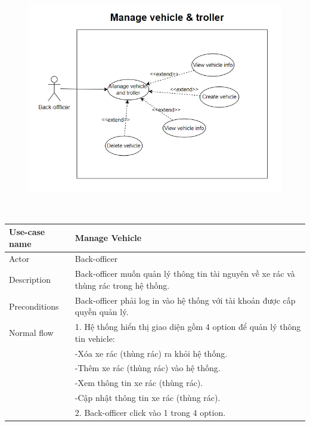 \documentclass[a4paper]{article}
\begin{document}
\begin{enumerate}
\begin{enumerate}
    \\
    \begin{figure}[!h]
        \centering
        \includegraphics[width=6in]{Image/manageVehicle_diagram.png}
    \end{figure}
    \\
    \begin{tabular}{| p{3cm} | p{10cm} |}
    \hline
         Use-case name & \textbf{Manage Vehicle}  \\
         \hline
         Actor & Back-officer \\
         \hline 
         Description & Back-officer muốn quản lý thông tin tài nguyên về xe rác và thùng rác trong hệ thống. \\
         \hline 
         Preconditions & Back-officer phải log in vào hệ thống với tài khoản được cấp quyền quản lý. \\
         \hline
         Normal flow 
         &1. Hệ thống hiển thị giao diện gồm 4 option để quản lý thông tin vehicle: \\
            &\hspace{1cm} -Xóa xe rác (thùng rác) ra khỏi hệ thống. \\
            &\hspace{1cm} -Thêm xe rác (thùng rác)  vào hệ thống. \\
            &\hspace{1cm} -Xem thông tin xe rác (thùng rác). \\
            &\hspace{1cm} -Cập nhật thông tin xe rác (thùng rác). \\
        &2. Back-officer click vào 1 trong 4 option. \\

\end{tabular}
\end{enumerate}
\end{enumerate}
\end{document}

